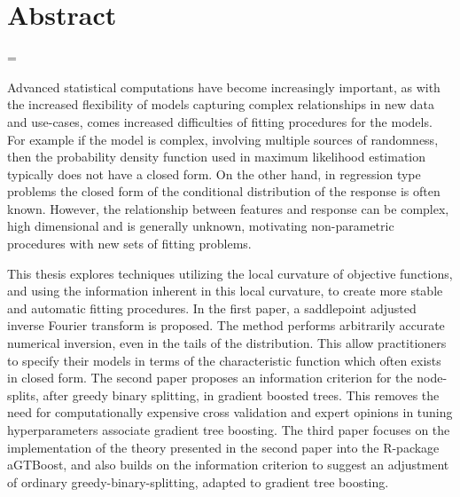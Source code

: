 \chapter*{Abstract}

\emergencystretch=\maxdimen
{}

Advanced statistical computations have become increasingly important, as with the increased flexibility of models capturing complex relationships in new data and use-cases,
comes increased difficulties of fitting procedures for the models.
For example if the model is complex, involving multiple sources of randomness, then the probability density function used in maximum likelihood estimation typically does not have a closed form.
On the other hand, in regression type problems the closed form of the conditional distribution of the response is often known. However, the relationship between features and response can be complex, high dimensional and is generally unknown, motivating non-parametric procedures with new sets of fitting problems.


This thesis explores techniques utilizing the local curvature of objective functions, and using the information inherent in this local curvature, to create more stable and automatic fitting procedures.
In the first paper, a saddlepoint adjusted inverse Fourier transform is proposed.
The method performs arbitrarily accurate numerical inversion, even in the tails of the distribution.
This allow practitioners to specify their models in terms of the characteristic function which often exists in closed form.
The second paper proposes an information criterion for the node-splits, after greedy binary splitting, in gradient boosted trees.
This removes the need for computationally expensive cross validation and expert opinions in tuning hyperparameters associate gradient tree boosting.
The third paper focuses on the implementation of the theory presented in the second paper into the R-package aGTBoost, and also builds on the information criterion to suggest an adjustment of ordinary greedy-binary-splitting, adapted to gradient tree boosting.

